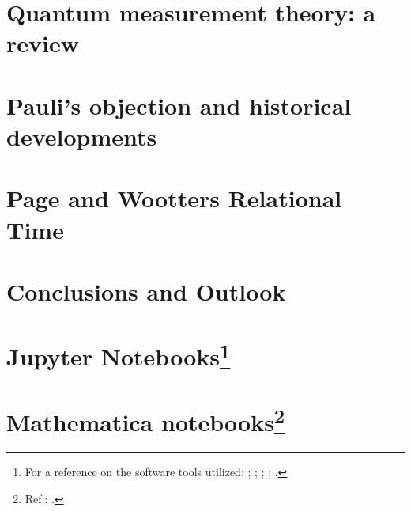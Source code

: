 \chapter{Quantum measurement theory: a review}\label{ch:decohere}





%



\chapter{Pauli's objection and historical developments}\label{ch:hist}






\chapter{Page and Wootters Relational Time}\label{ch:pw}\label{ch:detect}








\chapter{Conclusions and Outlook}\label{ch:outlook}




\appendix

\chapter[Jupyter Notebooks]{Jupyter Notebooks\footnote{
  For a reference on the software tools utilized:
  \cite{comp:scipy};
  \cite{comp:sympy};
  \cite{comp:jupyter};
  \cite{comp:matplotlib};
  \cite{comp:numpy}.
}}






\chapter[Mathematica notebooks]{Mathematica notebooks\footnote{
  Ref.: \cite{Wolfram}.
}}



\printbibliography[heading=bibintoc]



